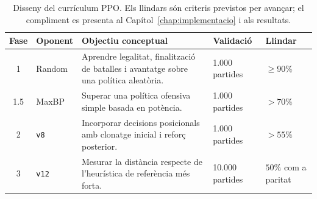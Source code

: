 \begin{table}[htbp]
    \centering
    \caption{Disseny del currículum PPO. Els llindars són criteris previstos per avançar; el compliment es presenta al Capítol~\ref{chap:implementacio} i als resultats.}
    \label{tab:ppo_curriculum_design}
    \small
    \renewcommand{\arraystretch}{1.25}
    \begin{tabularx}{\textwidth}{cl>{\raggedright\arraybackslash}Xll}
        \toprule
        \textbf{Fase} & \textbf{Oponent} & \textbf{Objectiu conceptual}                                                           & \textbf{Validació} & \textbf{Llindar}     \\
        \midrule
        1             & Random           & Aprendre legalitat, finalització de batalles i avantatge sobre una política aleatòria. & 1.000 partides     & $\ge 90\%$           \\
        \arrayrulecolor{gray!30}\hline\arrayrulecolor{black}
        1.5           & MaxBP            & Superar una política ofensiva simple basada en potència.                               & 1.000 partides     & $>70\%$              \\
        \arrayrulecolor{gray!30}\hline\arrayrulecolor{black}
        2             & \texttt{v8}      & Incorporar decisions posicionals amb clonatge inicial i reforç posterior.              & 1.000 partides     & $>55\%$              \\
        \arrayrulecolor{gray!30}\hline\arrayrulecolor{black}
        3             & \texttt{v12}     & Mesurar la distància respecte de l'heurística de referència més forta.                 & 10.000 partides    & $50\%$ com a paritat \\
        \bottomrule
    \end{tabularx}
\end{table}


